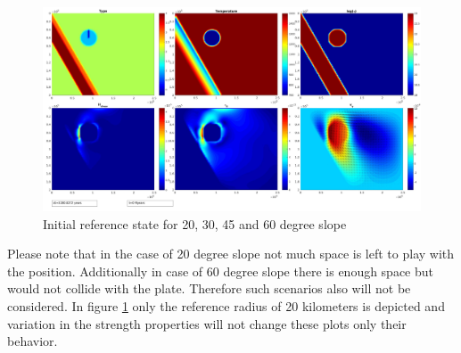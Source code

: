 \documentclass[12pt]{scrreprt}
\begin{document}
\begin{figure}[!ht]
\begin{minipage}[c]{1.0\textwidth}
\begin{minipage}[t]{0.5\textwidth}
		\end{minipage}
		\begin{minipage}[t]{0.5\textwidth}
			\includegraphics[width=1.0\textwidth]{./Snapshots/ref/Subductionzonewithblob1posrefslab60s2e7s2e7r20.jpg}
		\end{minipage}
	\end{minipage}
	\caption{Initial reference state for 20, 30, 45 and 60 degree slope}
	\label{fig:initial}
\end{figure}

Please note that in the case of 20 degree slope not much space is left to play with the position. Additionally in case of 60 degree slope there is enough space but would not collide with the plate. Therefore such scenarios also will not be considered. In figure \ref{fig:initial} only the reference radius of 20 kilometers is depicted and variation in the strength properties will not change these plots only their behavior. 
\end{document}

